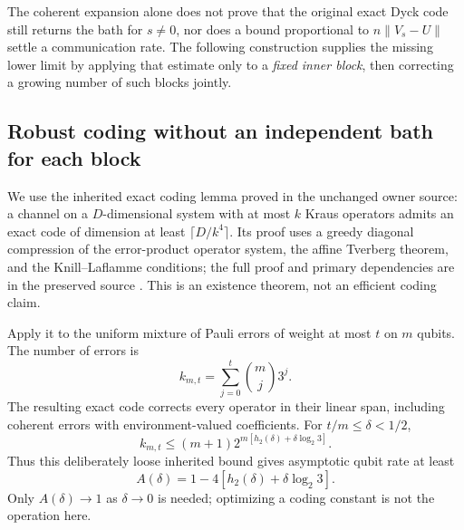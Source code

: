 \documentclass[11pt]{article}
\newcommand{\norm}[1]{\lVert #1\rVert}
\begin{document}
The coherent expansion alone does not prove that the original exact Dyck code still returns the bath for $s\ne0$, nor does a bound proportional to $n\norm{V_s-U}$ settle a communication rate. The following construction supplies the missing lower limit by applying that estimate only to a \emph{fixed inner block}, then correcting a growing number of such blocks jointly.

\subsection{Robust coding without an independent bath for each block}

We use the inherited exact coding lemma proved in the unchanged owner source: a channel on a $D$-dimensional system with at most $k$ Kraus operators admits an exact code of dimension at least $\lceil D/k^4\rceil$. Its proof uses a greedy diagonal compression of the error-product operator system, the affine Tverberg theorem, and the Knill--Laflamme conditions; the full proof and primary dependencies are in the preserved source \cite{Owner,KLV}. This is an existence theorem, not an efficient coding claim.

Apply it to the uniform mixture of Pauli errors of weight at most $t$ on $m$ qubits. The number of errors is
\[
 k_{m,t}=\sum_{j=0}^t\binom mj3^j.
\]
The resulting exact code corrects every operator in their linear span, including coherent errors with environment-valued coefficients. For $t/m\le\delta<1/2$,
\[
 k_{m,t}\le(m+1)2^{m[h_2(\delta)+\delta\log_2 3]}.
\]
Thus this deliberately loose inherited bound gives asymptotic qubit rate at least
\begin{equation}
 A(\delta)=1-4[h_2(\delta)+\delta\log_2 3].\label{eq:outerrate}
\end{equation}
Only $A(\delta)\to1$ as $\delta\to0$ is needed; optimizing a coding constant is not the operation here.
\end{document}
